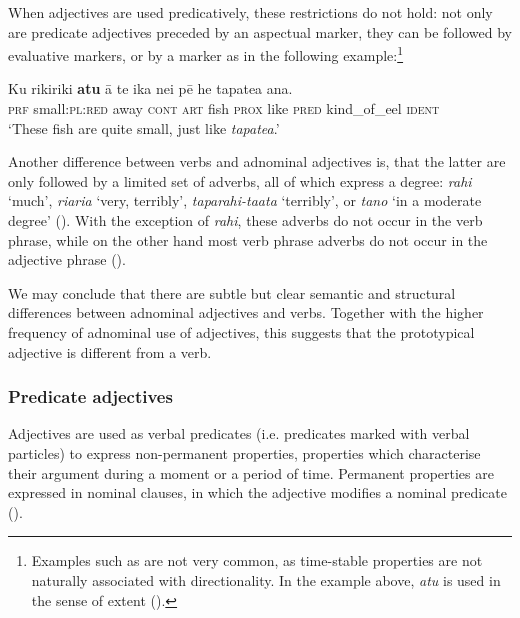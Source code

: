 When adjectives are used predicatively, these restrictions do not hold: not only are predicate adjectives preceded by an aspectual marker, they can be followed by evaluative markers, or by a  marker as in the following example:\footnote{\label{fn:135}Examples such as  are not very common, as time-stable properties are not naturally associated with directionality. In the example above, \textit{atu} is used in the sense of extent ().}

\ea\label{ex:3.98}
\gll Ku rikiriki \textbf{atu} {\ꞌ}ā te ika nei pē he tapatea {\ꞌ}ana.\\
\textsc{prf} small:\textsc{pl}:\textsc{red} away \textsc{cont} \textsc{art} fish \textsc{prox} like \textsc{pred} kind\_of\_eel \textsc{ident}\\

\glt
‘These fish are quite small, just like \textit{tapatea}.’ \textstyleExampleref{[R364.015]} 
\z

Another difference between verbs and adnominal adjectives is, that the latter are only followed by a limited set of adverbs, all of which express a degree: \textit{rahi} ‘much’, \textit{ri{\ꞌ}ari{\ꞌ}a} ‘very, terribly’, \textit{taparahi-ta{\ꞌ}ata} ‘terribly’, or \textit{tano} ‘in a moderate degree’ (). With the exception of \textit{rahi}, these adverbs do not occur in the verb phrase, while on the other hand most verb phrase adverbs do not occur in the adjective phrase ().

We may conclude that there are subtle but clear semantic and structural differences between adnominal adjectives and verbs. Together with the higher frequency of adnominal use of adjectives, this suggests that the prototypical adjective is different from a verb.

\subsubsection[Predicate adjectives]{Predicate adjectives}\label{sec:3.5.1.5}

Adjectives are used as verbal predicates (i.e. predicates marked with verbal particles) to express non-permanent properties, properties which characterise their argument during a moment or a period of time. Permanent properties are expressed in nominal clauses, in which the adjective modifies a nominal predicate ().

